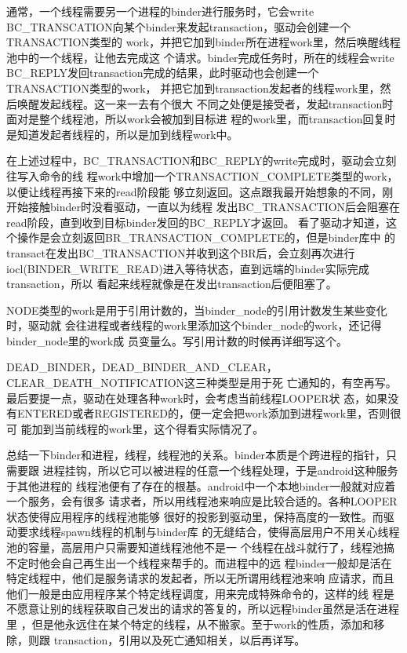 \documentclass[a4paper,11pt]{article}
\begin{document}
通常，一个线程需要另一个进程的binder进行服务时，它会write
BC_TRANSCATION向某个binder来发起transaction，驱动会创建一个TRANSACTION类型的
work，并把它加到binder所在进程work里，然后唤醒线程池中的一个线程，让他去完成这
个请求。binder完成任务时，所在的线程会write
BC_REPLY发回transaction完成的结果，此时驱动也会创建一个TRANSACTION类型的work，
并把它加到transaction发起者的线程work里，然后唤醒发起线程。这一来一去有个很大
不同之处便是接受者，发起transaction时面对是整个线程池，所以work会被加到目标进
程的work里，而transaction回复时是知道发起者线程的，所以是加到线程work中。

在上述过程中，BC_TRANSACTION和BC_REPLY的write完成时，驱动会立刻往写入命令的线
程work中增加一个TRANSACTION_COMPLETE类型的work，以便让线程再接下来的read阶段能
够立刻返回。这点跟我最开始想象的不同，刚开始接触binder时没看驱动，一直以为线程
发出BC_TRANSACTION后会阻塞在read阶段，直到收到目标binder发回的BC_REPLY才返回。
看了驱动才知道，这个操作是会立刻返回BR_TRANSACTION_COMPLETE的，但是binder库中
的transact在发出BC_TRANSACTION并收到这个BR后，会立刻再次进行
iocl(BINDER_WRITE_READ)进入等待状态，直到远端的binder实际完成transaction，所以
看起来线程就像是在发出transaction后便阻塞了。

NODE类型的work是用于引用计数的，当binder_node的引用计数发生某些变化时，驱动就
会往进程或者线程的work里添加这个binder_node的work，还记得binder_node里的work成
员变量么。写引用计数的时候再详细写这个。

DEAD_BINDER，DEAD_BINDER_AND_CLEAR，CLEAR_DEATH_NOTIFICATION这三种类型是用于死
亡通知的，有空再写。最后要提一点，驱动在处理各种work时，会考虑当前线程LOOPER状
态，如果没有ENTERED或者REGISTERED的，便一定会把work添加到进程work里，否则很可
能加到当前线程的work里，这个得看实际情况了。


总结一下binder和进程，线程，线程池的关系。binder本质是个跨进程的指针，只需要跟
进程挂钩，所以它可以被进程的任意一个线程处理，于是android这种服务于其他进程的
线程池便有了存在的根基。android中一个本地binder一般就对应着一个服务，会有很多
请求者，所以用线程池来响应是比较合适的。各种LOOPER状态使得应用程序的线程池能够
很好的投影到驱动里，保持高度的一致性。而驱动要求线程spawn线程的机制与binder库
的无缝结合，使得高层用户不用关心线程池的容量，高层用户只需要知道线程池他不是一
个线程在战斗就行了，线程池搞不定时他会自己再生出一个线程来帮手的。而进程中的远
程binder一般却是活在特定线程中，他们是服务请求的发起者，所以无所谓用线程池来响
应请求，而且他们一般是由应用程序某个特定线程调度，用来完成特殊命令的，这样的线
程是不愿意让别的线程获取自己发出的请求的答复的，所以远程binder虽然是活在进程里
，但是他永远住在某个特定的线程，从不搬家。至于work的性质，添加和移除，则跟
transaction，引用以及死亡通知相关，以后再详写。
\end{document}
